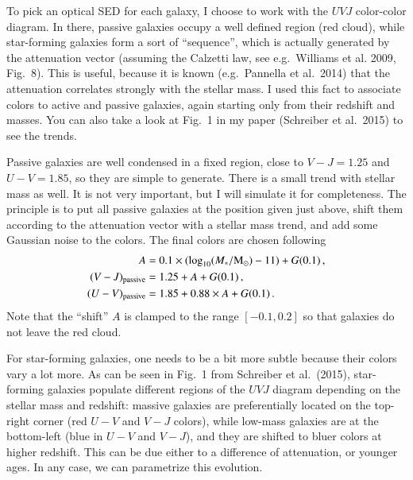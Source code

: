 \documentclass[12pt,a4paper]{article}
\newcommand{\msun}{{\rm M}_\odot}
\newcommand{\mstar}{M_\ast}
\newcommand{\uvj}{$UVJ$\xspace}
\begin{document}
To pick an optical SED for each galaxy, I choose to work with the \uvj color-color diagram. In there, passive galaxies occupy a well defined region (red cloud), while star-forming galaxies form a sort of ``sequence'', which is actually generated by the attenuation vector (assuming the Calzetti law, see e.g.~Williams et al. 2009, Fig.~8). This is useful, because it is known (e.g.~Pannella et al.~2014) that the attenuation correlates strongly with the stellar mass. I used this fact to associate colors to active and passive galaxies, again starting only from their redshift and masses. You can also take a look at Fig.~1 in my paper (Schreiber et al.~2015) to see the trends.

Passive galaxies are well condensed in a fixed region, close to $V-J = 1.25$ and $U-V = 1.85$, so they are simple to generate. There is a small trend with stellar mass as well. It is not very important, but I will simulate it for completeness. The principle is to put all passive galaxies at the position given just above, shift them according to the attenuation vector with a stellar mass trend, and add some Gaussian noise to the colors. The final colors are chosen following
\begin{align}
A &= 0.1 \times (\log_{10}(\mstar/\msun) - 11) + G(0.1)\,, \\
(V-J)_{\rm passive} &= 1.25 + A + G(0.1)\,, \\
(U-V)_{\rm passive} &= 1.85 + 0.88 \times A + G(0.1)\,.
\end{align}
Note that the ``shift'' $A$ is clamped to the range $[-0.1,0.2]$ so that galaxies do not leave the red cloud.

For star-forming galaxies, one needs to be a bit more subtle because their colors vary a lot more. As can be seen in Fig.~1 from Schreiber et al.~(2015), star-forming galaxies populate different regions of the \uvj diagram depending on the stellar mass and redshift: massive galaxies are preferentially located on the top-right corner (red $U-V$ and $V-J$ colors), while low-mass galaxies are at the bottom-left (blue in $U-V$ and $V-J$), and they are shifted to bluer colors at higher redshift. This can be due either to a difference of attenuation, or younger ages. In any case, we can parametrize this evolution.
\end{document}
